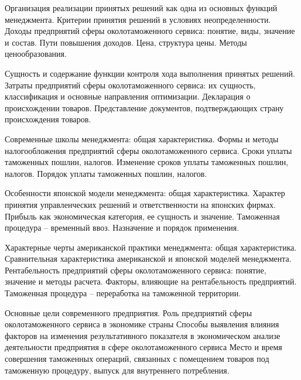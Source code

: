\documentclass[
	11pt,
	a4paper,
	]
	{article}
\begin{document}
\bigskip

\noindent{} 
	{
		Организация реализации принятых решений как одна из основных функций менеджмента. Критерии принятия решений в условиях неопределенности.
	}{
		Доходы предприятий сферы околотаможенного сервиса: понятие, виды, значение и состав. Пути повышения доходов.
	}{
		Цена, структура цены. Методы ценообразования.
	}

\bigskip

\noindent{} 
	{
		Сущность и содержание функции контроля хода выполнения принятых решений.
	}{
		Затраты предприятий сферы околотаможенного сервиса: их сущность, классификация и основные направления оптимизации.
	}{
		Декларация о происхождении товаров. Представление документов, подтверждающих страну происхождения товаров.
	}

\bigskip

\noindent{} 
	{
		Современные школы менеджмента: общая характеристика.
	}{
		Формы и методы налогообложения предприятий сферы околотаможенного сервиса.
	}{
		Сроки уплаты таможенных пошлин, налогов. Изменение сроков уплаты таможенных пошлин, налогов. Порядок уплаты таможенных пошлин, налогов.
	}

\bigskip

\noindent{} 
	{
		Особенности японской модели менеджмента: общая характеристика. Характер принятия управленческих решений и ответственности на японских фирмах.
	}{
		Прибыль как экономическая категория, ее сущность и значение.
	}{
		Таможенная процедура – временный ввоз. Назначение и порядок применения.
	}

\bigskip

\noindent{} 
	{
		Характерные черты американской практики менеджмента: общая характеристика. Сравнительная характеристика американской и японской моделей менеджмента.
	}{
		Рентабельность предприятий сферы околотаможенного сервиса: понятие, значение и методы расчета. Факторы, влияющие на рентабельность предприятий.
	}{
		Таможенная процедура – переработка на таможенной территории.
	}

\bigskip

\noindent{} 
	{
		Основные цели современного предприятия. Роль предприятий сферы околотаможенного сервиса в экономике страны
	}{
		Способы выявления влияния факторов на изменения результативного показателя в экономическом анализе деятельности предприятия в сфере околотаможенного сервиса
	}{
		Место и время совершения таможенных операций, связанных с помещением товаров под таможенную процедуру, выпуск для внутреннего потребления.
	}
\end{document}
